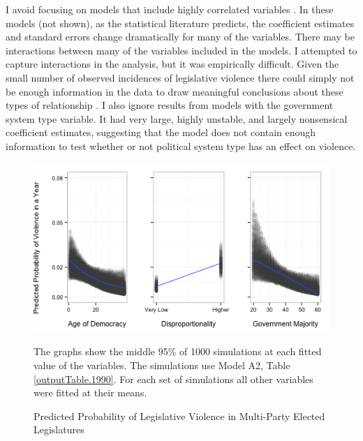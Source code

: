 \documentclass[a4paper]{article}\usepackage[]{graphicx}\usepackage[]{color}
\newenvironment{knitrout}{}{} %
\begin{document}
I avoid focusing on models that include highly correlated variables \citep[see][]{Achen2002, Schrodt2006}. In these models (not shown), as the statistical literature predicts, the coefficient estimates and standard errors change dramatically for many of the variables. There may be interactions between many of the variables included in the models. I attempted to capture interactions in the analysis, but it was empirically difficult. Given the small number of observed incidences of legislative violence there could simply not be enough information in the data to draw meaningful conclusions about these types of relationship \citep[see][]{Brambor2006}. I also ignore results from models with the government system type variable. It had very large, highly unstable, and largely nonsensical coefficient estimates, suggesting that the model does not contain enough information to test \citep{Babyak2004} whether or not political system type has an effect on violence.

\begin{figure}[t]
    \caption{Predicted Probability of Legislative Violence in Multi-Party Elected Legislatures}
    \label{pred_prob}
    \begin{center}


\begin{knitrout}
\color{fgcolor}
\includegraphics[width=0.8\linewidth]{figure/predProb} 

\end{knitrout}
    \end{center}
    \begin{singlespace}
      {\scriptsize{The graphs show the middle 95\% of 1000 simulations at each fitted value of the variables. The simulations use Model A2, Table \ref{outputTable.1990}. For each set of simulations all other variables were fitted at their means.}}
    \end{singlespace}
\end{figure}
\end{document}
